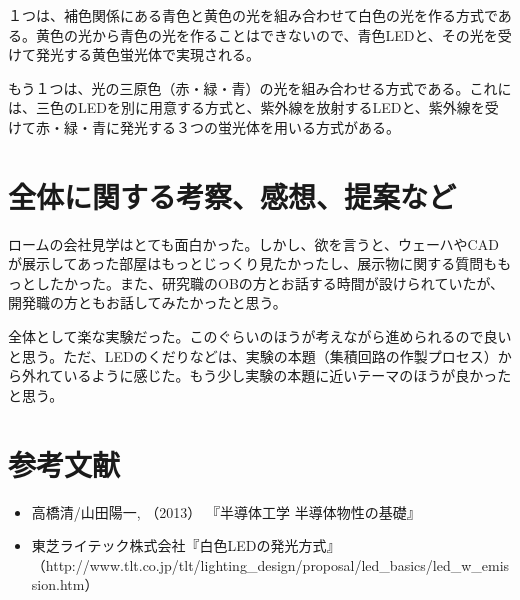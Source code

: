 \documentclass[11pt]{ltjsarticle}
\begin{document}
		１つは、補色関係にある青色と黄色の光を組み合わせて白色の光を作る方式である。黄色の光から青色の光を作ることはできないので、青色LEDと、その光を受けて発光する黄色蛍光体で実現される。
		
		もう１つは、光の三原色（赤・緑・青）の光を組み合わせる方式である。これには、三色のLEDを別に用意する方式と、紫外線を放射するLEDと、紫外線を受けて赤・緑・青に発光する３つの蛍光体を用いる方式がある。
	
\section{全体に関する考察、感想、提案など}
	ロームの会社見学はとても面白かった。しかし、欲を言うと、ウェーハやCADが展示してあった部屋はもっとじっくり見たかったし、展示物に関する質問ももっとしたかった。また、研究職のOBの方とお話する時間が設けられていたが、開発職の方ともお話してみたかったと思う。
	
	全体として楽な実験だった。このぐらいのほうが考えながら進められるので良いと思う。ただ、LEDのくだりなどは、実験の本題（集積回路の作製プロセス）から外れているように感じた。もう少し実験の本題に近いテーマのほうが良かったと思う。

\section{参考文献}
 	\begin{itemize}
		\item 高橋清/山田陽一, （2013） 『半導体工学 半導体物性の基礎』
		\item 東芝ライテック株式会社『白色LEDの発光方式』 （http://www.tlt.co.jp/tlt/lighting\_design/proposal/led\_basics/led\_w\_emission.htm）
 	\end{itemize}
\end{document}
